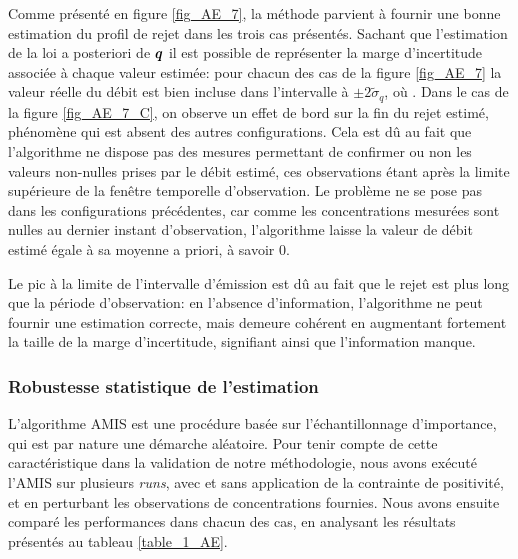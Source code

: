 {  Comme présenté en figure \ref{fig_AE_7}, la méthode parvient à fournir une bonne estimation du profil de rejet dans les trois cas présentés. Sachant que l'estimation de la loi a posteriori de ${\bm{q}}$  il est possible de représenter la marge d'incertitude associée à chaque valeur estimée: pour chacun des cas de la figure \ref{fig_AE_7} la valeur réelle du débit est bien incluse dans l'intervalle à $\pm 2\widetilde{\sigma}_q$, où . Dans le cas de la figure \ref{fig_AE_7_C}, {on observe un effet de bord sur la fin du rejet estimé, phénomène qui est absent des autres configurations. Cela est dû au fait que l'algorithme ne dispose pas des mesures permettant de confirmer ou non les valeurs non-nulles prises par le débit estimé, ces observations étant après la limite supérieure de la fenêtre temporelle d'observation. Le problème ne se pose pas dans les configurations précédentes, car comme les concentrations mesurées sont nulles au dernier instant d'observation, l'algorithme laisse la valeur de débit estimé égale à sa moyenne a priori, à savoir 0.}
  
  
  Le pic à la limite de l'intervalle d'émission est dû au fait que le rejet est plus long que la période d'observation: en l'absence d'information, l'algorithme ne peut fournir une estimation correcte, mais demeure cohérent  en augmentant fortement la taille de la marge d'incertitude, signifiant ainsi que l'information manque. \\
  
  \subsubsection{Robustesse statistique de l'estimation}
    
    L'algorithme AMIS est une procédure basée sur l'échantillonnage d'importance, qui est par nature une démarche aléatoire. Pour tenir compte de cette caractéristique dans la validation de notre méthodologie, nous avons exécuté l'AMIS sur plusieurs \textit{runs}, avec et sans application de la contrainte de positivité, et en perturbant les observations de concentrations fournies. Nous avons ensuite comparé les performances dans chacun des cas, en analysant les résultats présentés au tableau \ref{table_1_AE}. 
    
    \begin{table}[h!]
    	\centering
    	

\end{table}}
